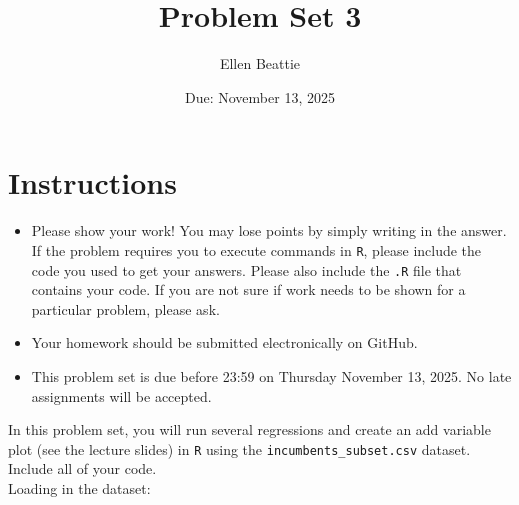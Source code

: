 \documentclass[12pt,letterpaper]{article}
\title{Problem Set 3}
\date{Due: November 13, 2025}
\author{Ellen Beattie}
\begin{document}
	\maketitle
	\section*{Instructions}
	\begin{itemize}
		\item Please show your work! You may lose points by simply writing in the answer. If the problem requires you to execute commands in \texttt{R}, please include the code you used to get your answers. Please also include the \texttt{.R} file that contains your code. If you are not sure if work needs to be shown for a particular problem, please ask.
	\item Your homework should be submitted electronically on GitHub.
	\item This problem set is due before 23:59 on Thursday November 13, 2025. No late assignments will be accepted.

	\end{itemize}

		\vspace{.25cm}
	
\noindent In this problem set, you will run several regressions and create an add variable plot (see the lecture slides) in \texttt{R} using the \texttt{incumbents\_subset.csv} dataset. Include all of your code. \\

Loading in the dataset: 


	\vspace{.5cm}
\end{document}
